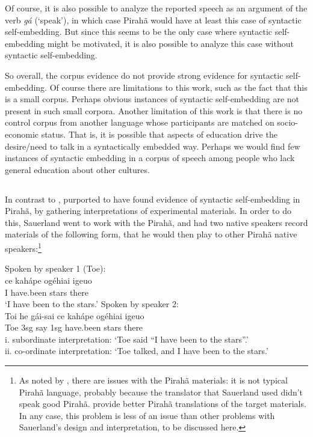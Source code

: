 \documentclass{article}
\begin{document}
Of course, it is also possible to analyze the reported speech as an argument of the verb \textit{gá} (`speak'), in which case Pirahã would have at least this case of syntactic self-embedding.  But since this seems to be the only case where syntactic self-embedding might be motivated, it is also possible to analyze this case without syntactic self-embedding.

So overall, the corpus evidence do not provide strong evidence for syntactic self-embedding. Of course there are limitations to this work, such as the fact that this is a small corpus.  Perhaps obvious instances of syntactic self-embedding are not present in such small corpora.  Another limitation of this work is that there is no control corpus from another language whose participants are matched on socio-economic status.  That is, it is possible that aspects of education drive the desire\slash need to talk in a syntactically embedded way.  Perhaps we would find few instances of syntactic embedding in a corpus of speech among people who lack general education about other cultures.

\subsection{}
\label{sauerland_sec}

In contrast to \citet{futrell2016corpus}, \citet{sauerland2018false} purported to have found evidence of syntactic self-embedding in Pirahã, by gathering interpretations of experimental materials. In order to do this, Sauerland went to work with the Pirahã, and had two native speakers record materials of the following form, that he would then play to other Pirahã native speakers:\footnote{As noted by \citet{everett2019recursion}, there are issues with the Pirahã materials: it is not typical Pirahã language, probably because the translator that Sauerland used didn't speak good Pirahã. \citet{everett2019recursion} provide better Pirahã translations of the target materials. In any case, this problem is less of an issue than other problems with Sauerland's design and interpretation, to be discussed here.}

\eal
\label{sauerland_ex}
\ex \label{sauerland_ex1} Spoken by speaker 1 (Toe):\\
\gll ce kahápe ogéhiai igeuo \\ 
     I have.been stars there\\
\glt `I have been to the stars.'
\ex \label{sauerland_ex2} Spoken by speaker 2:\\
\gll  Toi he gái-sai ce kahápe ogéhiai igeuo \\
      Toe 3sg say 1sg have.been stars there\\
\glt i. subordinate interpretation: `Toe said “I have been to the stars”.'\\
     ii. co-ordinate interpretation: `Toe talked, and I have been to the stars.'
\zl
\end{document}
